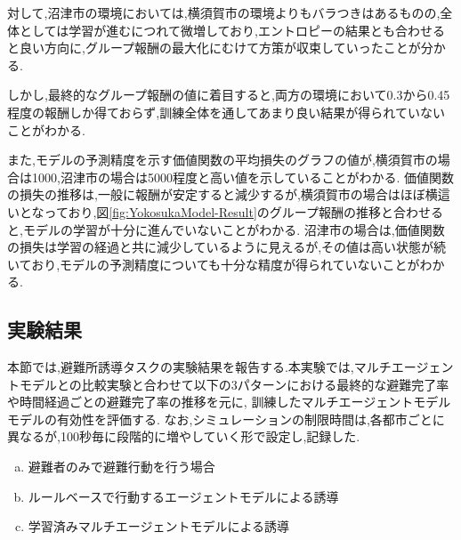 対して,沼津市の環境においては,横須賀市の環境よりもバラつきはあるものの,全体としては学習が進むにつれて微増しており,エントロピーの結果とも合わせると良い方向に,グループ報酬の最大化にむけて方策が収束していったことが分かる.\par
しかし,最終的なグループ報酬の値に着目すると,両方の環境において0.3から0.45程度の報酬しか得ておらず,訓練全体を通してあまり良い結果が得られていないことがわかる.\par
また,モデルの予測精度を示す価値関数の平均損失のグラフの値が,横須賀市の場合は1000,沼津市の場合は5000程度と高い値を示していることがわかる.
価値関数の損失の推移は,一般に報酬が安定すると減少するが,横須賀市の場合はほぼ横這いとなっており,図\ref{fig:YokosukaModel-Result}のグループ報酬の推移と合わせると,モデルの学習が十分に進んでいないことがわかる.
沼津市の場合は,価値関数の損失は学習の経過と共に減少しているように見えるが,その値は高い状態が続いており,モデルの予測精度についても十分な精度が得られていないことがわかる.\par
\subsection{実験結果}
本節では,避難所誘導タスクの実験結果を報告する.本実験では,マルチエージェントモデルとの比較実験と合わせて以下の3パターンにおける最終的な避難完了率や時間経過ごとの避難完了率の推移を元に,
訓練したマルチエージェントモデルモデルの有効性を評価する.
なお,シミュレーションの制限時間は,各都市ごとに異なるが,100秒毎に段階的に増やしていく形で設定し,記録した.
\begin{enumerate}[(a)]
  \item 避難者のみで避難行動を行う場合
  \item ルールベースで行動するエージェントモデルによる誘導
  \item 学習済みマルチエージェントモデルによる誘導
\end{enumerate}
